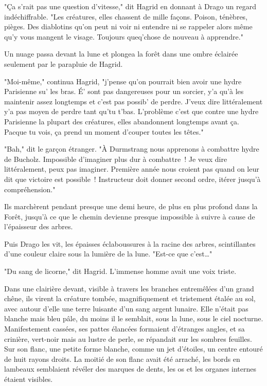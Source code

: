 "Ça s'rait pas une question d'vitesse," dit Hagrid en donnant à Drago un regard indéchiffrable. "Les créatures, elles chassent de mille façons. Poison, ténèbres, pièges. Des diablotins qu'on peut ni voir ni entendre ni se rappeler alors même qu'y vous mangent le visage. Toujours queq'chose de nouveau à apprendre."

Un nuage passa devant la lune et plongea la forêt dans une ombre éclairée seulement par le parapluie de Hagrid.

"Moi-même," continua Hagrid, "j'pense qu'on pourrait bien avoir une hydre Parisienne su' les bras. É' sont pas dangereuses pour un sorcier, y'a qu'à les maintenir assez longtemps et c'est pas possib' de perdre. J'veux dire littéralement y'a pas moyen de perdre tant qu'tu t'bas. L'problème c'est que contre une hydre Parisienne la plupart des créatures, elles abandonnent longtemps avant ça. Pacque tu vois, ça prend un moment d'couper toutes les têtes."

"Bah," dit le garçon étranger. "À Durmstrang nous apprenons à combattre hydre de Bucholz. Impossible d'imaginer plus dur à combattre~! Je veux dire littéralement, peux pas imaginer. Première année nous croient pas quand on leur dit que victoire est possible~! Instructeur doit donner second ordre, itérer jusqu'à compréhension."

Ils marchèrent pendant presque une demi heure, de plus en plus profond dans la Forêt, jusqu'à ce que le chemin devienne presque impossible à suivre à cause de l'épaisseur des arbres.

Puis Drago les vit, les épaisses éclaboussures à la racine des arbres, scintillantes d'une couleur claire sous la lumière de la lune. "Est-ce que c'est…"

"Du sang de licorne," dit Hagrid. L'immense homme avait une voix triste.

Dans une clairière devant, visible à travers les branches entremêlées d'un grand chêne, ils virent la créature tombée, magnifiquement et tristement étalée au sol, avec autour d'elle une terre luisante d'un sang argent lunaire. Elle n'était pas blanche mais bleu pâle, du moins il le semblait, sous la lune, sous le ciel nocturne. Manifestement cassées, ses pattes élancées formaient d'étranges angles, et sa crinière, vert-noir mais au lustre de perle, se répandait sur les sombres feuilles. Sur son flanc, une petite forme blanche, comme un jet d'étoiles, un centre entouré de huit rayons droits. La moitié de son flanc avait été arraché, les bords en lambeaux semblaient révéler des marques de dents, les os et les organes internes étaient visibles.

